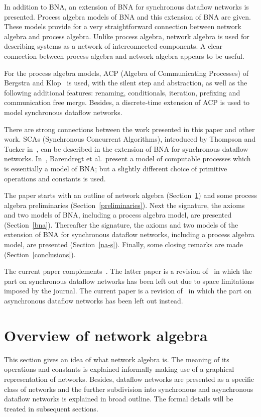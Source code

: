 \documentclass[fleqn]{llncs}
\begin{document}
In addition to BNA, an extension of BNA for synchronous dataflow
networks is presented.
Process algebra models of BNA and this extension of BNA are given.
These models provide for a very straightforward connection between
network algebra and process algebra.
Unlike process algebra, network algebra is used for describing systems 
as a network of interconnected components.
A clear connection between process algebra and network algebra appears 
to be useful.

For the process algebra models, ACP (Algebra of Communicating Processes)
of Bergstra and Klop~\cite{BK84b} is used, with the silent step and
abstraction, as well as the following additional features: renaming,
conditionals, iteration, prefixing and communication free merge.
Besides, a discrete-time extension of ACP is used to model synchronous 
dataflow networks.

There are strong connections between the work presented in this paper
and other work.
SCAs (Synchronous Concurrent Algorithms), introduced by Thompson and
Tucker in~\cite{TT91}, can be described in the extension of BNA for
synchronous dataflow networks.
In~\cite{BWM94}, Barendregt et al.\ present a model of computable
processes which is essentially a model of BNA; but a slightly different
choice of primitive operations and constants is used.

The paper starts with an outline of network algebra
(Section~\ref{overview}) and some process algebra preliminaries
(Section~\ref{preliminaries}).
Next the signature, the axioms and two models of BNA, including a
process algebra model, are presented (Section~\ref{bna}).
Thereafter the signature, the axioms and two models of the extension of 
BNA for synchronous dataflow networks, including a process algebra 
model, are presented (Section~\ref{na-s}).
Finally, some closing remarks are made (Section~\ref{conclusions}).

The current paper complements~\cite{BMS97a}.
The latter paper is a revision of~\cite{BMS95a} in which the part on 
synchronous dataflow networks has been left out due to space limitations
imposed by the journal.
The current paper is a revision of~\cite{BMS95a} in which the part on 
asynchronous dataflow networks has been left out instead.

\section{Overview of network algebra}
\label{overview}
This section gives an idea of what network algebra is.
The meaning of its operations and constants is explained informally
making use of a graphical representation of networks.
Besides, dataflow networks are presented as a specific class of
networks and the further subdivision into synchronous and asynchronous
dataflow networks is explained in broad outline.
The formal details will be treated in subsequent sections.
\end{document}
